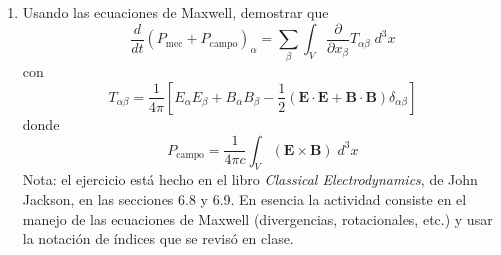 \documentclass[12pt]{article}
\begin{document}
\begin{enumerate}
\item Usando las ecuaciones de Maxwell, demostrar que
\[ \dfrac{d}{dt} ( P_{\text{mec}} + P_{\text{campo}} )_{\alpha} = \sum_{\beta} \int_{V} \dfrac{\partial}{\partial x_{\beta}} T_{\alpha \beta} \; d^{3} x \]
con
\[ T_{\alpha \beta} =  \dfrac{1}{4 \pi} \left[ E_{\alpha} E_{\beta} + B_{\alpha} B_{\beta} - \dfrac{1}{2} (\mathbf{E} \cdot \mathbf{E} + \mathbf{B} \cdot \mathbf{B}) \delta_{\alpha \beta} \right]  \]
donde
\[ P_{\text{campo}} = \dfrac{1}{4 \pi c} \int_{V} (\mathbf{E} \times \mathbf{B}) \; d^{3} x \]
Nota: el ejercicio está hecho en el libro \emph{Classical Electrodynamics}, de John Jackson, en las secciones 6.8 y 6.9. En esencia la actividad consiste en el manejo de las ecuaciones de Maxwell (divergencias, rotacionales, etc.) y usar la notación de índices que se revisó en clase.
\end{enumerate}
\end{document}
